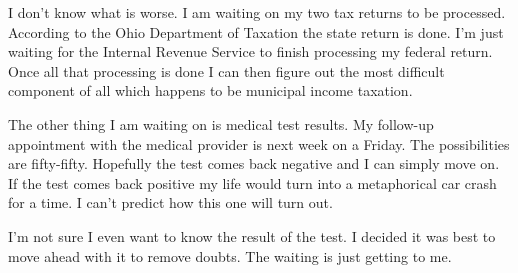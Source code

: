 I don't know what is worse. I am waiting on my two tax returns to be
processed. According to the Ohio Department of Taxation the state return
is done. I'm just waiting for the Internal Revenue Service to finish
processing my federal return. Once all that processing is done I can
then figure out the most difficult component of all which happens to be
municipal income taxation.

The other thing I am waiting on is medical test results. My follow-up
appointment with the medical provider is next week on a Friday. The
possibilities are fifty-fifty. Hopefully the test comes back negative
and I can simply move on. If the test comes back positive my life would
turn into a metaphorical car crash for a time. I can't predict how this
one will turn out.

I'm not sure I even want to know the result of the test. I decided it
was best to move ahead with it to remove doubts. The waiting is just
getting to me.
